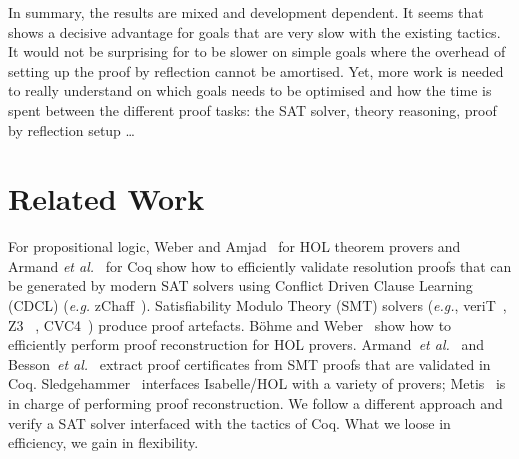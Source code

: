 \documentclass[a4paper,UKenglish,cleveref, autoref, thm-restate]{lipics-v2019}
\begin{document}
In summary, the results are mixed and development dependent.
%
It seems that  shows a decisive advantage for goals that
are very slow with the existing tactics.
%
It would not be surprising for  to be slower on simple goals where
the overhead of setting up the proof by reflection cannot be amortised.
%
Yet, more work is needed to really understand on which goals
 needs to be optimised and how the time is spent between
the different proof tasks: the SAT solver, theory reasoning, proof by
reflection setup \dots 

\section{Related Work}
\label{sec:related-work}


For propositional logic, Weber and Amjad~\cite{WeberA09} for HOL
theorem provers and Armand \emph{et al.}~\cite{ArmandGST10} for Coq
show how to efficiently validate resolution proofs that can be
generated by modern SAT solvers using Conflict Driven Clause Learning (CDCL)
(\emph{e.g.} zChaff~\cite{MoskewiczMZZM01}).
%
Satisfiability Modulo Theory (SMT) solvers (\emph{e.g.},
veriT~\cite{BoutonODF09}, Z3~\cite{MouraB08} ,
CVC4~\cite{DetersR0BT14}) produce proof artefacts. Böhme and
Weber~\cite{BohmeW10} show how to efficiently perform proof
reconstruction for HOL provers. Armand~\emph{et
  al.}~\cite{ArmandFGKTW11} and Besson~\emph{et al.}~\cite{BessonCP11}
extract proof certificates from SMT proofs that are validated in Coq.
%
Sledgehammer~\cite{BlanchetteBP13} interfaces Isabelle/HOL with a
variety of provers; Metis~\cite{Hurd03first-orderproof,PaulsonS07} is
in charge of performing proof reconstruction.
%
We follow a different approach and verify a SAT solver interfaced with
the tactics of Coq. What we loose in efficiency, we gain in flexibility.
\end{document}
